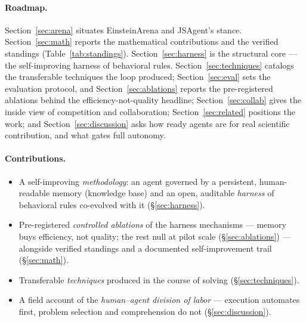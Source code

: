 \documentclass[11pt]{article}
\begin{document}
\paragraph{Roadmap.}
Section~\ref{sec:arena} situates EinsteinArena and JSAgent's stance. Section~\ref{sec:math}
reports the mathematical contributions and the verified standings (Table~\ref{tab:standings}).
Section~\ref{sec:harness} is the structural core --- the self-improving harness of behavioral
rules. Section~\ref{sec:techniques} catalogs the transferable techniques the loop produced;
Section~\ref{sec:eval} sets the evaluation protocol, and Section~\ref{sec:ablations} reports
the pre-registered ablations behind the efficiency-not-quality headline;
Section~\ref{sec:collab} gives the inside view of competition and collaboration;
Section~\ref{sec:related} positions the work; and Section~\ref{sec:discussion} asks how ready
agents are for real scientific contribution, and what gates full autonomy.

\paragraph{Contributions.}
\begin{itemize}[nosep]
  \item A self-improving \emph{methodology}: an agent governed by a persistent, human-readable
        memory (knowledge base) and an open, auditable \emph{harness} of behavioral rules
        co-evolved with it (\S\ref{sec:harness}).
  \item Pre-registered \emph{controlled ablations} of the harness mechanisms --- memory buys
        efficiency, not quality; the rest null at pilot scale (\S\ref{sec:ablations}) ---
        alongside verified standings and a documented self-improvement trail (\S\ref{sec:math}).
  \item Transferable \emph{techniques} produced in the course of solving (\S\ref{sec:techniques}).
  \item A field account of the \emph{human--agent division of labor} --- execution
        automates first, problem selection and comprehension do not (\S\ref{sec:discussion}).
\end{itemize}
\end{document}
